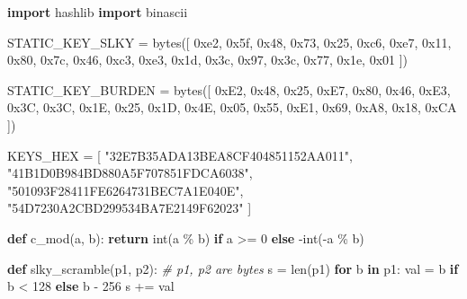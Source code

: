 \documentclass[
]{article}
\newenvironment{Shaded}{}{}
\newcommand{\BaseNTok}[1]{\textcolor[rgb]{0.25,0.63,0.44}{#1}}
\newcommand{\BuiltInTok}[1]{\textcolor[rgb]{0.00,0.50,0.00}{#1}}
\newcommand{\CommentTok}[1]{\textcolor[rgb]{0.38,0.63,0.69}{\textit{#1}}}
\newcommand{\ControlFlowTok}[1]{\textcolor[rgb]{0.00,0.44,0.13}{\textbf{#1}}}
\newcommand{\DecValTok}[1]{\textcolor[rgb]{0.25,0.63,0.44}{#1}}
\newcommand{\ImportTok}[1]{\textcolor[rgb]{0.00,0.50,0.00}{\textbf{#1}}}
\newcommand{\KeywordTok}[1]{\textcolor[rgb]{0.00,0.44,0.13}{\textbf{#1}}}
\newcommand{\NormalTok}[1]{#1}
\newcommand{\OperatorTok}[1]{\textcolor[rgb]{0.40,0.40,0.40}{#1}}
\newcommand{\StringTok}[1]{\textcolor[rgb]{0.25,0.44,0.63}{#1}}
\begin{document}
\begin{Shaded}
\begin{Highlighting}[]

\ImportTok{import}\NormalTok{ hashlib}
\ImportTok{import}\NormalTok{ binascii}

\NormalTok{STATIC\_KEY\_SLKY }\OperatorTok{=} \BuiltInTok{bytes}\NormalTok{([}
    \BaseNTok{0xe2}\NormalTok{, }\BaseNTok{0x5f}\NormalTok{, }\BaseNTok{0x48}\NormalTok{, }\BaseNTok{0x73}\NormalTok{, }\BaseNTok{0x25}\NormalTok{, }\BaseNTok{0xc6}\NormalTok{, }\BaseNTok{0xe7}\NormalTok{, }\BaseNTok{0x11}\NormalTok{, }
    \BaseNTok{0x80}\NormalTok{, }\BaseNTok{0x7c}\NormalTok{, }\BaseNTok{0x46}\NormalTok{, }\BaseNTok{0xc3}\NormalTok{, }\BaseNTok{0xe3}\NormalTok{, }\BaseNTok{0x1d}\NormalTok{, }\BaseNTok{0x3c}\NormalTok{, }\BaseNTok{0x97}\NormalTok{, }
    \BaseNTok{0x3c}\NormalTok{, }\BaseNTok{0x77}\NormalTok{, }\BaseNTok{0x1e}\NormalTok{, }\BaseNTok{0x01}
\NormalTok{])}

\NormalTok{STATIC\_KEY\_BURDEN }\OperatorTok{=} \BuiltInTok{bytes}\NormalTok{([}
    \BaseNTok{0xE2}\NormalTok{, }\BaseNTok{0x48}\NormalTok{, }\BaseNTok{0x25}\NormalTok{, }\BaseNTok{0xE7}\NormalTok{, }\BaseNTok{0x80}\NormalTok{, }\BaseNTok{0x46}\NormalTok{, }\BaseNTok{0xE3}\NormalTok{, }\BaseNTok{0x3C}\NormalTok{,}
    \BaseNTok{0x3C}\NormalTok{, }\BaseNTok{0x1E}\NormalTok{, }\BaseNTok{0x25}\NormalTok{, }\BaseNTok{0x1D}\NormalTok{, }\BaseNTok{0x4E}\NormalTok{, }\BaseNTok{0x05}\NormalTok{, }\BaseNTok{0x55}\NormalTok{, }\BaseNTok{0xE1}\NormalTok{,}
    \BaseNTok{0x69}\NormalTok{, }\BaseNTok{0xA8}\NormalTok{, }\BaseNTok{0x18}\NormalTok{, }\BaseNTok{0xCA}
\NormalTok{])}

\NormalTok{KEYS\_HEX }\OperatorTok{=}\NormalTok{ [}
    \StringTok{"32E7B35ADA13BEA8CF404851152AA011"}\NormalTok{,}
    \StringTok{"41B1D0B984BD880A5F707851FDCA6038"}\NormalTok{,}
    \StringTok{"501093F28411FE6264731BEC7A1E040E"}\NormalTok{,}
    \StringTok{"54D7230A2CBD299534BA7E2149F62023"}
\NormalTok{]}

\KeywordTok{def}\NormalTok{ c\_mod(a, b):}
    \ControlFlowTok{return} \BuiltInTok{int}\NormalTok{(a }\OperatorTok{\%}\NormalTok{ b) }\ControlFlowTok{if}\NormalTok{ a }\OperatorTok{\textgreater{}=} \DecValTok{0} \ControlFlowTok{else} \OperatorTok{{-}}\BuiltInTok{int}\NormalTok{(}\OperatorTok{{-}}\NormalTok{a }\OperatorTok{\%}\NormalTok{ b)}

\KeywordTok{def}\NormalTok{ slky\_scramble(p1, p2):}
    \CommentTok{\# p1, p2 are bytes}
\NormalTok{    s }\OperatorTok{=} \BuiltInTok{len}\NormalTok{(p1)}
    \ControlFlowTok{for}\NormalTok{ b }\KeywordTok{in}\NormalTok{ p1:}
\NormalTok{        val }\OperatorTok{=}\NormalTok{ b }\ControlFlowTok{if}\NormalTok{ b }\OperatorTok{\textless{}} \DecValTok{128} \ControlFlowTok{else}\NormalTok{ b }\OperatorTok{{-}} \DecValTok{256}
\NormalTok{        s }\OperatorTok{+=}\NormalTok{ val}
    

\end{Highlighting}
\end{Shaded}
\end{document}
